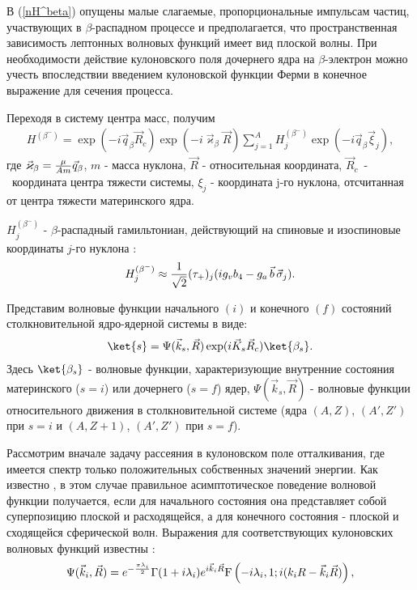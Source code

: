 В (\ref{nH^beta}) опущены малые слагаемые, пропорциональные импульсам частиц,
участвующих в $\beta$-распадном процессе и предполагается, что пространственная
зависимость лептонных волновых функций имеет вид плоской волны.
При необходимости действие
кулоновского поля дочернего ядра на $\beta$-электрон можно учесть
впоследствии введением кулоновской функции
Ферми в конечное выражение для сечения процесса.

Переходя в систему центра масс, получим
\begin{eqnarray}\label{H^beta}
H^{(\beta^-)}=\exp{(-i\vec q_\beta\vec R_c)}\exp{( -i \vec \varkappa_\beta \vec R)}
\sum_{j=1}^A H^{(\beta^-)}_{j}\exp{(-i\vec q_\beta\vec\xi_{j})},
\end{eqnarray}
где  $\vec \varkappa_\beta=
{\mu\over Am}\vec q_\beta$, $m$ - масса нуклона,
$\vec R$ - относительная координата, $\vec R_c$~-~координата
центра тяжести системы,
$\xi_j$  - координата j-го нуклона, отсчитанная от центра тяжести материнского
ядра.

$H^{(\beta^-)}_{j}$ - $\beta$-распадный гамильтониан, действующий
на спиновые и изоспиновые координаты $j$-го нуклона \cite{aiz}:
\begin{eqnarray}
H^{(\beta^-)}_{j}\approx {1\over{\sqrt 2}}(\tau_+)_j ( i g_v b_4 - g_a\, \vec b\, \vec \sigma_j ).\nonumber
\end{eqnarray}


Представим волновые функции начального $(i)$ и конечного $(f)$ состояний
столкновительной ядро-ядерной системы в виде:
\begin{eqnarray}
\ket{s}= \Psi(\vec k_s, \vec R)\exp(i \vec K_s \vec R_c) \ket{ \beta_s}.
\end{eqnarray}
Здесь
$\ket{ \beta_s}$ - волновые функции, характеризующие внутренние состояния
материнского ($s=i$) или дочернего ($s=f$) ядер,
$\Psi (\vec k_s, \vec R)$ - волновые функции относительного движения в
столкновительной системе (ядра $(A,Z)$, $(A',Z')$ при $s=i$
и $(A,Z+1)$, $(A',Z')$ при $s=f$).

Рассмотрим вначале задачу рассеяния в кулоновском поле отталкивания, где имеется  спектр только положительных собственных
значений энергии. Как известно \cite{landau}, в этом случае правильное асимптотическое поведение волновой функции
получается, если для начального состояния она представляет собой суперпозицию плоской и расходящейся, а для конечного
состояния - плоской и сходящейся сферической волн. Выражения для соответствующих кулоновских волновых функций известны
\cite{landau}:
\begin{eqnarray}\label{psi_i}
\Psi (\vec k_i, \vec R)=e^{-{\pi \lambda_i\over2}} \Gamma(1+i\lambda_i)
e^{i \vec k_i \vec R} {\rm F} \left(- i \lambda_i,1;i(k_i R - \vec k_i \vec R)\right),
\end{eqnarray}

